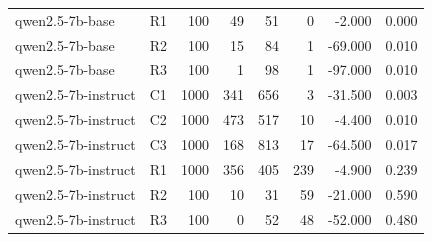 \begin{table}
\begin{tabular}{llrrrrrr}
qwen2.5-7b-base & R1 & 100 & 49 & 51 & 0 & -2.000 & 0.000 \\
qwen2.5-7b-base & R2 & 100 & 15 & 84 & 1 & -69.000 & 0.010 \\
qwen2.5-7b-base & R3 & 100 & 1 & 98 & 1 & -97.000 & 0.010 \\
qwen2.5-7b-instruct & C1 & 1000 & 341 & 656 & 3 & -31.500 & 0.003 \\
qwen2.5-7b-instruct & C2 & 1000 & 473 & 517 & 10 & -4.400 & 0.010 \\
qwen2.5-7b-instruct & C3 & 1000 & 168 & 813 & 17 & -64.500 & 0.017 \\
qwen2.5-7b-instruct & R1 & 1000 & 356 & 405 & 239 & -4.900 & 0.239 \\
qwen2.5-7b-instruct & R2 & 100 & 10 & 31 & 59 & -21.000 & 0.590 \\
qwen2.5-7b-instruct & R3 & 100 & 0 & 52 & 48 & -52.000 & 0.480 \\
\bottomrule
\end{tabular}
\end{table}
